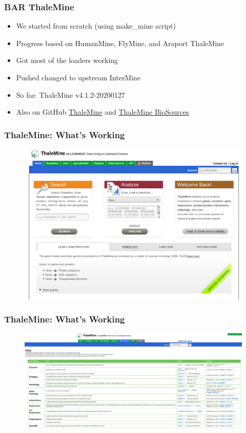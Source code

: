 \documentclass{beamer}
\begin{document}
\begin{frame}
    \frametitle{BAR ThaleMine}
    \begin{itemize}
        \item We started from scratch (using make\_mine script)
        \item Progress based on HumanMine, FlyMine, and Araport ThaleMine
        \item Got most of the loaders working
        \item Pushed changed to upstream InterMine
        \item So far: ThaleMine v4.1.2-20200127
        \item Also on GitHub \href{https://github.com/asherpasha/thalemine}{ThaleMine} and \href{https://github.com/asherpasha/thalemine-bio-sources}{ThaleMine BioSources}
    \end{itemize}
\end{frame}

\begin{frame}
    \frametitle{ThaleMine: What's Working}
    \begin{figure}[H]
        \centering
        \includegraphics[width=\columnwidth]{img/ThaleMine.png}
    \end{figure}
\end{frame}

\begin{frame}
    \frametitle{ThaleMine: What's Working}
    \begin{figure}[H]
        \centering
        \includegraphics[width=\columnwidth]{img/ThaleMineData.png}
    \end{figure}
\end{frame}
\end{document}
